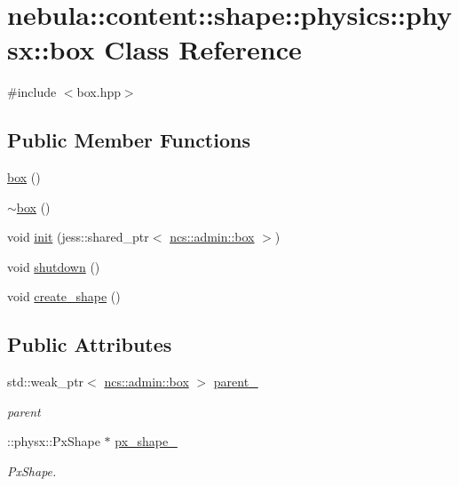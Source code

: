 \hypertarget{classnebula_1_1content_1_1shape_1_1physics_1_1physx_1_1box}{
\section{nebula::content::shape::physics::physx::box Class Reference}
\label{classnebula_1_1content_1_1shape_1_1physics_1_1physx_1_1box}
}


{\ttfamily \#include $<$box.hpp$>$}\subsection*{Public Member Functions}
\begin{DoxyCompactItemize}
\item 
\hyperlink{classnebula_1_1content_1_1shape_1_1physics_1_1physx_1_1box_a028b393110324611c327c1517fa89b7c}{box} ()
\item 
\hyperlink{classnebula_1_1content_1_1shape_1_1physics_1_1physx_1_1box_a6b9f0581150add85429b7f514e0d2e77}{$\sim$box} ()
\item 
void \hyperlink{classnebula_1_1content_1_1shape_1_1physics_1_1physx_1_1box_a0757a121f19b6fdeb814f0e8e0642bdb}{init} (jess::shared\_\-ptr$<$ \hyperlink{classnebula_1_1content_1_1shape_1_1admin_1_1box}{ncs::admin::box} $>$)
\item 
void \hyperlink{classnebula_1_1content_1_1shape_1_1physics_1_1physx_1_1box_a0298108f52d58835399ac2be44a8cafe}{shutdown} ()
\item 
void \hyperlink{classnebula_1_1content_1_1shape_1_1physics_1_1physx_1_1box_aefdbed35ebe13c28f533bcae59fd9d32}{create\_\-shape} ()
\end{DoxyCompactItemize}
\subsection*{Public Attributes}
\begin{DoxyCompactItemize}
\item 
std::weak\_\-ptr$<$ \hyperlink{classnebula_1_1content_1_1shape_1_1admin_1_1box}{ncs::admin::box} $>$ \hyperlink{classnebula_1_1content_1_1shape_1_1physics_1_1physx_1_1box_ac630d4ca757f32941bb81620ffd82ad1}{parent\_\-}
\begin{DoxyCompactList}\small\item\em parent \item\end{DoxyCompactList}\item 
::physx::PxShape $\ast$ \hyperlink{classnebula_1_1content_1_1shape_1_1physics_1_1physx_1_1box_a4c358ddb71d2e6530ba14c13f82c175e}{px\_\-shape\_\-}
\begin{DoxyCompactList}\small\item\em PxShape. \item\end{DoxyCompactList}\end{DoxyCompactItemize}


